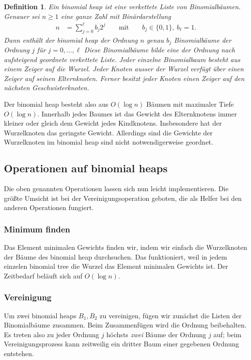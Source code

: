 \documentclass[10pt,reqno]{amsart}
\numberwithin{equation}{section}
\newtheorem{definition}{Definition}[section]
\begin{document}
\begin{definition}\label{def_binomial_heap}
	Ein binomial heap ist eine verkettete Liste von Binomialb\"aumen.
	Genauer sei $n\ge1$ eine ganze Zahl mit Bin\"ardarstellung 
	\begin{align*}
		n&=\sum_{j=0}^\ell b_j2^j&&\mbox{ mit }&&b_j\in\{0,1\},\ b_\ell=1.
	\end{align*}
	Dann enth\"alt der binomial heap der Ordnung $n$ genau $b_j$ Binomialb\"aume der Ordnung $j$ f\"ur $j=0,\ldots,\ell$
	Diese Binomialb\"aume bilde eine der Ordnung nach aufsteigend geordnete verkettete Liste.
	Jeder einzelne Binomialbaum besteht aus einem Zeiger auf die Wurzel.
	Jeder Knoten ausser der Wurzel verf\"ugt \"uber einen Zeiger auf seinen Elternknoten.
	Ferner besitzt jeder Knoten einen Zeiger auf den n\"achsten Geschwisterknoten.
\end{definition}

Der binomial heap besteht also aus $O(\log n)$ B\"aumen mit maximaler Tiefe $O(\log n)$.
Innerhalb jedes Baumes ist das Gewicht des Elternknotens immer kleiner oder gleich dem Gewicht jedes Kindknotens.
Insbesondere hat der Wurzelknoten das geringste Gewicht.
Allerdings sind die Gewichte der Wurzelknoten im binomial heap sind nicht notwendigerweise geordnet.

\subsection{Operationen auf binomial heaps}\label{sec_binomial_heaps_ops}
Die oben genannten Operationen lassen sich nun leicht implementieren.
Die gr\"o\ss te Umsicht ist bei der Vereinigungsoperation geboten, die als Helfer bei den anderen Operationen fungiert.

\subsubsection{Minimum finden}
Das Element minimalen Gewichts finden wir, indem wir einfach die Wurzelknoten der B\"aume des binomial heap durchsuchen.
Das funktioniert, weil in jedem einzelen binomial tree die Wurzel das Element minimalen Gewichts ist.
Der Zeitbedarf bel\"auft sich auf $O(\log n)$.

\subsubsection{Vereinigung}

Um zwei binomial heaps $B_1,B_2$ zu vereinigen, f\"ugen wir zun\"achst die Listen der Binomialb\"aume zusammen.
Beim Zusammenf\"ugen wird die Ordnung beibehalten.
Es treten also zu jeder Ordnung $j$ h\"ochsts {\em zwei} B\"aume der Ordnung $j$ auf; beim Vereinigungsprozess kann zeitweilig ein dritter Baum einer gegebenen Ordnung entstehen.
\end{document}
